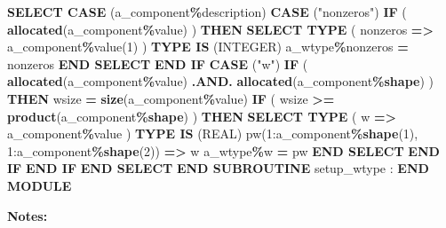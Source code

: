 \documentclass[
  paper=a4,
  ,captions=tableheading
]{scrartcl}
\newenvironment{Shaded}{\begin{snugshade}}{\end{snugshade}}
\newcommand{\DataTypeTok}[1]{\textcolor[rgb]{0.13,0.29,0.53}{#1}}
\newcommand{\DecValTok}[1]{\textcolor[rgb]{0.00,0.00,0.81}{#1}}
\newcommand{\FunctionTok}[1]{\textcolor[rgb]{0.13,0.29,0.53}{\textbf{#1}}}
\newcommand{\KeywordTok}[1]{\textcolor[rgb]{0.13,0.29,0.53}{\textbf{#1}}}
\newcommand{\NormalTok}[1]{#1}
\newcommand{\OperatorTok}[1]{\textcolor[rgb]{0.81,0.36,0.00}{\textbf{#1}}}
\newcommand{\StringTok}[1]{\textcolor[rgb]{0.31,0.60,0.02}{#1}}
\begin{document}
\begin{Shaded}
\begin{Highlighting}[]
      \KeywordTok{SELECT CASE}\NormalTok{ (a\_component}\OperatorTok{\%}\NormalTok{description)}
      \KeywordTok{CASE}\NormalTok{ (}\StringTok{"nonzeros"}\NormalTok{)}
         \KeywordTok{IF}\NormalTok{ ( }\FunctionTok{allocated}\NormalTok{(a\_component}\OperatorTok{\%}\DataTypeTok{value}\NormalTok{) ) }\KeywordTok{THEN}
            \KeywordTok{SELECT TYPE}\NormalTok{ ( nonzeros }\KeywordTok{=}\OperatorTok{\textgreater{}}\NormalTok{ a\_component}\OperatorTok{\%}\DataTypeTok{value}\NormalTok{(}\DecValTok{1}\NormalTok{) )}
            \KeywordTok{TYPE IS}\NormalTok{ (}\DataTypeTok{INTEGER}\NormalTok{)}
\NormalTok{               a\_wtype}\OperatorTok{\%}\NormalTok{nonzeros }\KeywordTok{=}\NormalTok{ nonzeros}
            \KeywordTok{END SELECT}
         \KeywordTok{END IF}
      \KeywordTok{CASE}\NormalTok{ (}\StringTok{"w"}\NormalTok{)}
         \KeywordTok{IF}\NormalTok{ ( }\FunctionTok{allocated}\NormalTok{(a\_component}\OperatorTok{\%}\DataTypeTok{value}\NormalTok{) }\OperatorTok{.AND.} \FunctionTok{allocated}\NormalTok{(a\_component}\OperatorTok{\%}\FunctionTok{shape}\NormalTok{) ) }\KeywordTok{THEN}
\NormalTok{            wsize }\KeywordTok{=} \FunctionTok{size}\NormalTok{(a\_component}\OperatorTok{\%}\DataTypeTok{value}\NormalTok{)}
            \KeywordTok{IF}\NormalTok{ ( wsize }\OperatorTok{\textgreater{}=} \FunctionTok{product}\NormalTok{(a\_component}\OperatorTok{\%}\FunctionTok{shape}\NormalTok{) ) }\KeywordTok{THEN}
               \KeywordTok{SELECT TYPE}\NormalTok{ ( w }\KeywordTok{=}\OperatorTok{\textgreater{}}\NormalTok{ a\_component}\OperatorTok{\%}\DataTypeTok{value}\NormalTok{ )}
               \KeywordTok{TYPE IS}\NormalTok{ (}\DataTypeTok{REAL}\NormalTok{)}
\NormalTok{                  pw(}\DecValTok{1}\NormalTok{:a\_component}\OperatorTok{\%}\FunctionTok{shape}\NormalTok{(}\DecValTok{1}\NormalTok{), }\DecValTok{1}\NormalTok{:a\_component}\OperatorTok{\%}\FunctionTok{shape}\NormalTok{(}\DecValTok{2}\NormalTok{)) }\KeywordTok{=}\OperatorTok{\textgreater{}}\NormalTok{ w}
\NormalTok{                  a\_wtype}\OperatorTok{\%}\NormalTok{w }\KeywordTok{=}\NormalTok{ pw}
               \KeywordTok{END SELECT}
            \KeywordTok{END IF}
         \KeywordTok{END IF}
      \KeywordTok{END SELECT}
   \KeywordTok{END SUBROUTINE}\NormalTok{ setup\_wtype}
\NormalTok{   :}
\KeywordTok{END MODULE}
\end{Highlighting}
\end{Shaded}

\textbf{Notes:}
\end{document}
